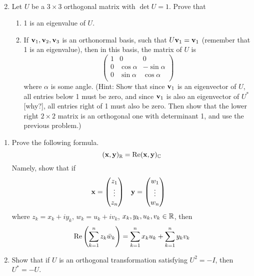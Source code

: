 \documentclass[../psets.tex]{subfiles}
\begin{document}
\begin{enumerate}[label={\textbf{6.\arabic*.}}]
\begin{enumerate}
\begin{align*}
        \end{align*}
    \end{enumerate}
    \item Let $U$ be a $3\times 3$ orthogonal matrix with $\det U=1$. Prove that
    \begin{enumerate}
        \item 1 is an eigenvalue of $U$.
        \item If $\mathbf{v}_1,\mathbf{v}_2,\mathbf{v}_3$ is an orthonormal basis, such that $U\mathbf{v}_1=\mathbf{v}_1$ (remember that 1 is an eigenvalue), then in this basis, the matrix of $U$ is
        \begin{equation*}
            \begin{pmatrix}
                1 & 0 & 0\\
                0 & \cos\alpha & -\sin\alpha\\
                0 & \sin\alpha & \cos\alpha\\
            \end{pmatrix}
        \end{equation*}
        where $\alpha$ is some angle. (Hint: Show that since $\mathbf{v}_1$ is an eigenvector of $U$, all entries below 1 must be zero, and since $\mathbf{v}_1$ is also an eigenvector of $U^*$ [why?], all entries right of 1 must also be zero. Then show that the lower right $2\times 2$ matrix is an orthogonal one with determinant 1, and use the previous problem.)
    \end{enumerate}
\end{enumerate}

\begin{enumerate}[label={\textbf{8.\arabic*.}}]
    \item Prove the following formula.
    \begin{equation*}
        (\mathbf{x},\mathbf{y})_{\mathbb{R}} = \operatorname{Re}(\mathbf{x},\mathbf{y})_{\mathbb{C}}
    \end{equation*}
    Namely, show that if
    \begin{align*}
        \mathbf{x} &=
        \begin{pmatrix}
            z_1\\
            \vdots\\
            z_n\\
        \end{pmatrix}&
        \mathbf{y} &=
        \begin{pmatrix}
            w_1\\
            \vdots\\
            w_n\\
        \end{pmatrix}
    \end{align*}
    where $z_k=x_k+iy_k$, $w_k=u_k+iv_k$, $x_k,y_k,u_k,v_k\in\mathbb{R}$, then
    \begin{equation*}
        \operatorname{Re}\left( \sum_{k=1}^nz_k\bar{w}_k \right) = \sum_{k=1}^nx_ku_k+\sum_{k=1}^ny_kv_k
    \end{equation*}
    \setcounter{enumi}{3}
    \item Show that if $U$ is an orthogonal transformation satisfying $U^2=-I$, then $U^*=-U$.
\end{enumerate}
\end{document}
